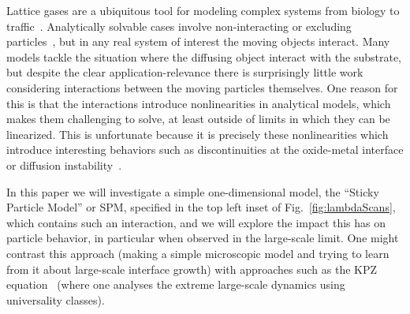 \documentclass[
reprint,
 amsmath,amssymb,
 aps,
 prl,
]{revtex4-1}
\begin{document}
Lattice gases are a ubiquitous tool for modeling complex systems from biology to traffic~\cite{1742-5468-2011-07-P07007, Mobilia2007, tegner2015high, zhu2012atomic, DealGrove1965, MottCabrera1949, Buzzaccaro2007}. 
Analytically solvable cases involve non-interacting or excluding particles~\cite{ladd1988application, liggett1985interacting, BenNaim1999}, but in any real system of interest the moving objects interact. Many models tackle the situation where the diffusing
object interact with the substrate,
but despite the clear application-relevance there is surprisingly little work considering interactions between the moving particles themselves.  One reason for this is that the interactions introduce nonlinearities in analytical models, which makes them
challenging to solve, at least outside of limits in which they can be linearized. This is unfortunate because it is precisely these nonlinearities which introduce interesting behaviors such as discontinuities at the oxide-metal interface or
diffusion instability~\cite{Obukhovsky2017, Gorokhova2010}.

In this paper we will
investigate a simple one-dimensional model, the ``Sticky Particle Model'' or SPM, specified in the top left inset of Fig.~\ref{fig:lambdaScans}, which contains such an interaction, and we will explore the impact this has on particle behavior, in particular
when observed in the large-scale limit.
One might contrast
this approach (making a simple microscopic model and trying to learn from it about large-scale interface growth) with approaches such as the KPZ equation~\cite{PhysRevLett.56.889, PhysRevA.38.4271, Sasamoto2010} (where one analyses the extreme
large-scale dynamics using universality classes).

\end{document}
